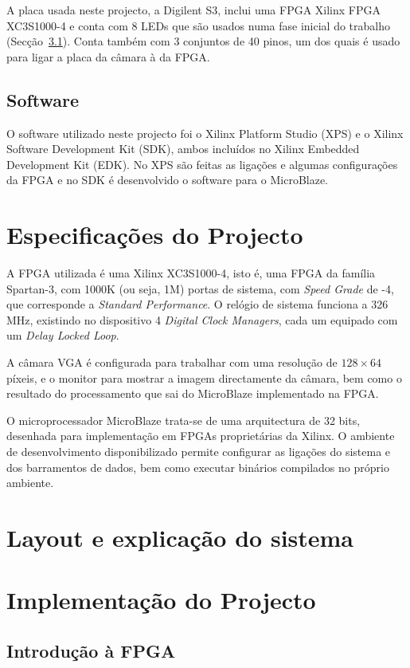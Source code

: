 \documentclass[a4paper,12pt]{article}
\begin{document}
A placa usada neste projecto, a Digilent S3,  inclui uma FPGA Xilinx FPGA XC3S1000-4 e conta com 8 LEDs que são usados numa fase inicial do trabalho (Secção~\ref{subsec:LEDs}). Conta também com 3 conjuntos de 40 pinos, um dos quais é usado para ligar a placa da câmara à da FPGA.

\subsection*{Software}
O software utilizado neste projecto foi o Xilinx Platform Studio (XPS) e o Xilinx Software Development Kit (SDK), ambos incluídos no Xilinx Embedded Development Kit (EDK). No XPS são feitas as ligações e algumas configurações da FPGA e no SDK é desenvolvido o software para o MicroBlaze.

\section{Especificações do Projecto}

A FPGA utilizada é uma Xilinx XC3S1000-4, isto é, uma FPGA da família Spartan-3, com 1000K (ou seja, 1M) portas de sistema, com \textit{Speed Grade} de -4, que corresponde a \textit{Standard Performance}. O relógio de sistema funciona a 326 MHz, existindo no dispositivo 4 \textit{Digital Clock Managers}, cada um equipado com um \textit{Delay Locked Loop}.

A câmara VGA é configurada para trabalhar com uma resolução de $128\times64$ píxeis, e o monitor para mostrar a imagem directamente da câmara, bem como o resultado do processamento que sai do MicroBlaze implementado na FPGA.

O microprocessador MicroBlaze trata-se de uma arquitectura de 32 bits, desenhada para implementação em FPGAs proprietárias da Xilinx. O ambiente de desenvolvimento disponibilizado permite configurar as ligações do sistema e dos barramentos de dados, bem como executar binários compilados no próprio ambiente.

\section{Layout e explicação do sistema}


\section{Implementação do Projecto}
\subsection{Introdução à FPGA}
\label{subsec:LEDs}
\end{document}
